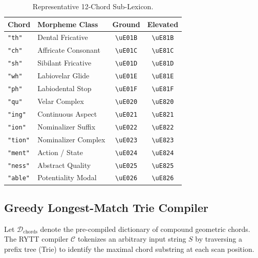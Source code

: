 \documentclass[11pt,oneside,letterpaper]{article}
\theoremstyle{definition}
\begin{document}
\begin{table}[htbp]
\centering
\footnotesize
\caption{Representative 12-Chord Sub-Lexicon.}
\label{tab:chord_dict}
\begin{tabularx}{\columnwidth}{lXcc}
\toprule
\textbf{Chord} & \textbf{Morpheme Class} & \textbf{Ground} & \textbf{Elevated} \\
\midrule
\texttt{"th"}   & Dental Fricative     & \texttt{\textbackslash uE01B} & \texttt{\textbackslash uE81B} \\
\texttt{"ch"}   & Affricate Consonant  & \texttt{\textbackslash uE01C} & \texttt{\textbackslash uE81C} \\
\texttt{"sh"}   & Sibilant Fricative   & \texttt{\textbackslash uE01D} & \texttt{\textbackslash uE81D} \\
\texttt{"wh"}   & Labiovelar Glide     & \texttt{\textbackslash uE01E} & \texttt{\textbackslash uE81E} \\
\texttt{"ph"}   & Labiodental Stop     & \texttt{\textbackslash uE01F} & \texttt{\textbackslash uE81F} \\
\texttt{"qu"}   & Velar Complex        & \texttt{\textbackslash uE020} & \texttt{\textbackslash uE820} \\
\texttt{"ing"}  & Continuous Aspect    & \texttt{\textbackslash uE021} & \texttt{\textbackslash uE821} \\
\texttt{"ion"}  & Nominalizer Suffix   & \texttt{\textbackslash uE022} & \texttt{\textbackslash uE822} \\
\texttt{"tion"} & Nominalizer Complex  & \texttt{\textbackslash uE023} & \texttt{\textbackslash uE823} \\
\texttt{"ment"} & Action / State       & \texttt{\textbackslash uE024} & \texttt{\textbackslash uE824} \\
\texttt{"ness"} & Abstract Quality     & \texttt{\textbackslash uE025} & \texttt{\textbackslash uE825} \\
\texttt{"able"} & Potentiality Modal   & \texttt{\textbackslash uE026} & \texttt{\textbackslash uE826} \\
\bottomrule
\end{tabularx}
\end{table}

\subsection{Greedy Longest-Match Trie Compiler}
Let $\mathcal{D}_{\text{chords}}$ denote the pre-compiled dictionary of compound geometric chords. The RYTT compiler $\mathcal{C}$ tokenizes an arbitrary input string $S$ by traversing a prefix tree (Trie) to identify the maximal chord substring at each scan position.
\end{document}
